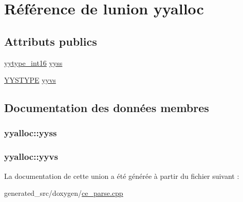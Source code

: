 \hypertarget{unionyyalloc}{}\section{Référence de l\textquotesingle{}union yyalloc}
\label{unionyyalloc}
\subsection*{Attributs publics}
\begin{DoxyCompactItemize}
\item 
\hyperlink{ce__parse_8cpp_ade5b97f0021a4f6c5922ead3744ab297}{yytype\+\_\+int16} \hyperlink{unionyyalloc_aad44e4a724037e32eeb58333c516bb45}{yyss}
\item 
\hyperlink{ce__parse_8h_a2af2fd0824f967ec31ce1773894931e1}{Y\+Y\+S\+T\+Y\+P\+E} \hyperlink{unionyyalloc_a9494cc8d8cd0eba1b44ca20fe89de5d2}{yyvs}
\end{DoxyCompactItemize}


\subsection{Documentation des données membres}
\hypertarget{unionyyalloc_aad44e4a724037e32eeb58333c516bb45}{}
\subsubsection[{yyss}]{ yyalloc\+::yyss}\label{unionyyalloc_aad44e4a724037e32eeb58333c516bb45}
\hypertarget{unionyyalloc_a9494cc8d8cd0eba1b44ca20fe89de5d2}{}
\subsubsection[{yyvs}]{ yyalloc\+::yyvs}\label{unionyyalloc_a9494cc8d8cd0eba1b44ca20fe89de5d2}


La documentation de cette union a été générée à partir du fichier suivant \+:\begin{DoxyCompactItemize}
\item 
generated\+\_\+src/doxygen/\hyperlink{ce__parse_8cpp}{ce\+\_\+parse.\+cpp}\end{DoxyCompactItemize}
